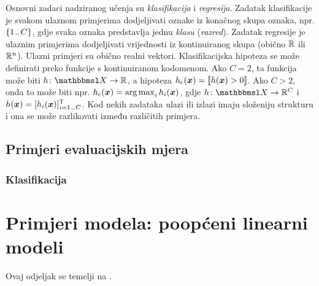 \documentclass[utf8, diplomski, lmodern]{fer}
\begin{document}
Osnovni zadaci nadziranog učenja su \emph{klasifikacija} i \emph{regresija}. Zadatak klasifikacije je svakom ulaznom primjerima dodjeljivati oznake iz konačnog skupa oznaka, npr. $\cbr{1\bidot C}$, gdje svaka oznaka predstavlja jednu \emph{klasu} (\emph{razred}). Zadatak regresije je ulaznim primjerima dodjeljivati vrijednosti iz kontinuiranog skupa (obično $\mathbb{R}$ ili $\mathbb{R}^n$). Ulazni primjeri su obično realni vektori. Klasifikacijska hipoteza se može definirati preko funkcije s kontinuiranom kodomenom. Ako $C=2$, ta funkcija može biti $\funcdef{h}{\set X}{\R}$, a hipoteza $h_\text{c}(\vec x)=\enbbracket{h(\vec x)>0}$. Ako $C>2$, onda to može biti npr. $h_\text{c}(\vec x)=\argmax_i h_i(\vec x)$, gdje $\funcdef{h}{\set X}{\R^C}$ i $h(\vec x)=\sbr{h_i(\vec x)}_{i=1\bidot C}^\tp$. Kod nekih zadataka ulazi ili izlazi imaju složeniju strukturu i ona se može razlikovati između različitih primjera.

\subsection{Primjeri evaluacijskih mjera}


\subsubsection{Klasifikacija}



\section{Primjeri modela: poopćeni linearni modeli} \label{sec:poopceni-linearni-modeli}

Ovaj odjeljak se temelji na \citep{Snajder:2014:SU}.
\end{document}

